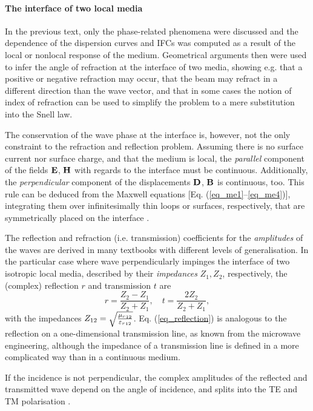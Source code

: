 \paragraph{The interface of two local media} %
In the previous text, only the phase-related phenomena were discussed and the dependence of the dispersion curves and IFCs was computed as a result of the local or nonlocal response of the medium. Geometrical arguments then were used to infer the angle of refraction at the interface of two media, showing e.g. that a positive or negative refraction may occur, that the beam may refract in a different direction than the wave vector, and that in some cases the notion of index of refraction can be used to simplify the problem to a mere substitution into the Snell law.

The conservation of the wave phase at the interface is, however, not the only constraint to the refraction and reflection problem. Assuming there is no surface current nor surface charge, and that the medium is local, the \textit{parallel} component of the fields $\mathbf{E}$, $\mathbf{H}$ with regards to the interface must be continuous. Additionally, the \textit{perpendicular} component of the displacements $\mathbf{D}$, $\mathbf{B}$ is continuous, too. This rule can be deduced from the Maxwell equations [Eq.  (\ref{eq_me1}--\ref{eq_me4})], integrating them over infinitesimally thin loops or surfaces, respectively, that are symmetrically placed on the interface \cite[pp. 26-29]{klingshirn2007semiconductor}. 

The reflection and refraction (i.e. transmission) coefficients for the \textit{amplitudes} of the waves are derived in many textbooks  with different levels of generalisation.  
In the particular case where wave perpendicularly impinges the interface of two isotropic local media, described by their \textit{impedances} $Z_1, Z_2$, respectively, the (complex) reflection $r$ and transmission $t$ are
\begin{equation} r = \frac{Z_2 - Z_1}{Z_2+Z_1}, \quad t = \frac{2 Z_2}{Z_2 + Z_1}, \label{eq_reflection}\end{equation}
with the impedances
$Z_{12} = \sqrt{\frac{{\mu_r}_{12}}{{\varepsilon_r}_{12}  }  }$.
Eq. (\ref{eq_reflection}) is analogous to the reflection on a one-dimensional transmission line, as known from the microwave engineering, although the impedance of a transmission line is defined in a more complicated way than in a continuous medium.

If the incidence is not perpendicular, the complex amplitudes of the reflected and transmitted wave depend on the angle of incidence, and splits into the TE and TM polarisation \cite[p. 38]{born1999book}.  %


